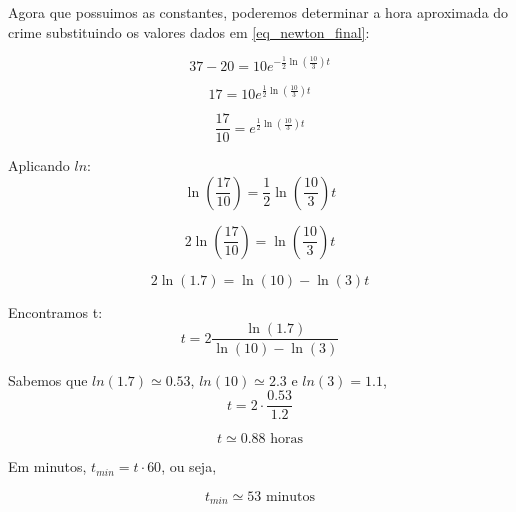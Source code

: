 \documentclass[11pt]{article}
\begin{document}
Agora que possuimos as constantes, poderemos determinar a hora
aproximada do crime substituindo os valores dados em
\eqref{eq_newton_final}:

\begin{equation*}
    \label{eq_newton_subst_1}
    37 - 20 = 10e^{-\frac{1}{2}\ln(\frac{10}{3})t}
\end{equation*}

\begin{equation*}
    \label{eq_newton_subst_2}
    17 = 10e^{\frac{1}{2}\ln(\frac{10}{3})t}
\end{equation*}

\begin{equation*}
    \label{eq_newton_subst_3}
    \frac{17}{10} = e^{\frac{1}{2}\ln(\frac{10}{3})t}
\end{equation*}

Aplicando \(ln\): \begin{equation*}
    \label{eq_newton_subst_4}
    \ln(\frac{17}{10}) = \frac{1}{2}\ln(\frac{10}{3})t
\end{equation*}

\begin{equation*}
    \label{eq_newton_subst_5}
    2\ln(\frac{17}{10}) = \ln(\frac{10}{3})t
\end{equation*}

\begin{equation*}
    \label{eq_newton_subst_6}
    2\ln(1.7) = \ln(10) - \ln(3)t
\end{equation*}

Encontramos t: \begin{equation*}
    \label{eq_newton_subst_7}
    t = 2\frac{\ln(1.7)}{\ln(10) - \ln(3)}
\end{equation*}

Sabemos que \(ln(1.7) \simeq 0.53\), \(ln(10) \simeq 2.3\) e
\(ln(3) = 1.1\), \begin{equation*}
    \label{eq_newton_subst_8}
    t = 2 \cdot\frac{0.53}{1.2}
\end{equation*}

\begin{equation*}
    \label{eq_newton_subst_9}
    t \simeq 0.88 \text{ horas}
\end{equation*}

Em minutos, \(t_{min} = t \cdot 60\), ou seja,

\begin{equation*}
    \label{eq_newton_subst_resp}
    t_{min} \simeq 53 \text{ minutos}
\end{equation*}
\end{document}
